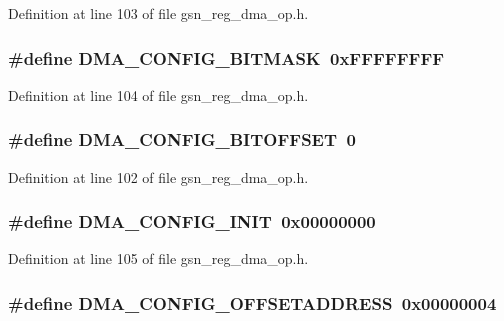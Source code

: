 Definition at line 103 of file gsn\_\-reg\_\-dma\_\-op.h.

\hypertarget{a00547_accf659d57fc0a37d95980ede8a99b1d6}{
\subsubsection[{DMA\_\-CONFIG\_\-BITMASK}]{\setlength{\rightskip}{0pt plus 5cm}\#define DMA\_\-CONFIG\_\-BITMASK~0xFFFFFFFF}}
\label{a00547_accf659d57fc0a37d95980ede8a99b1d6}


Definition at line 104 of file gsn\_\-reg\_\-dma\_\-op.h.

\hypertarget{a00547_aac655fa012c21874055c777f49c4c7ff}{
\subsubsection[{DMA\_\-CONFIG\_\-BITOFFSET}]{\setlength{\rightskip}{0pt plus 5cm}\#define DMA\_\-CONFIG\_\-BITOFFSET~0}}
\label{a00547_aac655fa012c21874055c777f49c4c7ff}


Definition at line 102 of file gsn\_\-reg\_\-dma\_\-op.h.

\hypertarget{a00547_ada82320bd161f2e5b75c28cbd0da748c}{
\subsubsection[{DMA\_\-CONFIG\_\-INIT}]{\setlength{\rightskip}{0pt plus 5cm}\#define DMA\_\-CONFIG\_\-INIT~0x00000000}}
\label{a00547_ada82320bd161f2e5b75c28cbd0da748c}


Definition at line 105 of file gsn\_\-reg\_\-dma\_\-op.h.

\hypertarget{a00547_a8a7b68f545ca97d9c238efb1ff7d9005}{
\subsubsection[{DMA\_\-CONFIG\_\-OFFSETADDRESS}]{\setlength{\rightskip}{0pt plus 5cm}\#define DMA\_\-CONFIG\_\-OFFSETADDRESS~0x00000004}}
\label{a00547_a8a7b68f545ca97d9c238efb1ff7d9005}


